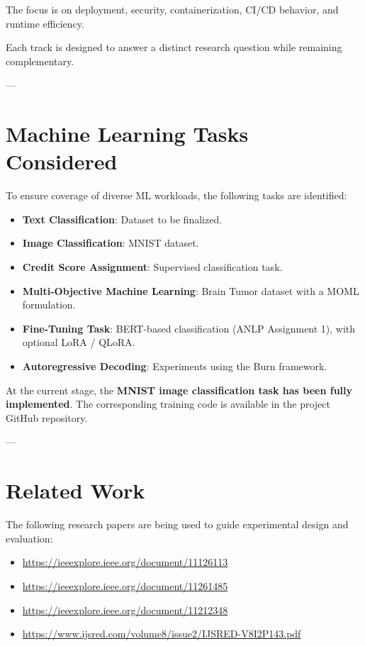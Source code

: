 \documentclass[10pt,a4paper,twocolumn]{article}
\begin{document}
The focus is on deployment, security, containerization, CI/CD behavior, and runtime efficiency.

Each track is designed to answer a distinct research question while remaining complementary.

---

\section{Machine Learning Tasks Considered}

To ensure coverage of diverse ML workloads, the following tasks are identified:

\begin{itemize}
    \item \textbf{Text Classification}: Dataset to be finalized.
    \item \textbf{Image Classification}: MNIST dataset.
    \item \textbf{Credit Score Assignment}: Supervised classification task.
    \item \textbf{Multi-Objective Machine Learning}: Brain Tumor dataset with a MOML formulation.
    \item \textbf{Fine-Tuning Task}: BERT-based classification (ANLP Assignment 1), with optional LoRA / QLoRA.
    \item \textbf{Autoregressive Decoding}: Experiments using the Burn framework.
\end{itemize}

At the current stage, the \textbf{MNIST image classification task has been fully implemented}.  
The corresponding training code is available in the project GitHub repository.

---

\section{Related Work}

The following research papers are being used to guide experimental design and evaluation:

\begin{itemize}
    \item \url{https://ieeexplore.ieee.org/document/11126113}
    \item \url{https://ieeexplore.ieee.org/document/11261485}
    \item \url{https://ieeexplore.ieee.org/document/11212348}
    \item \url{https://www.ijsred.com/volume8/issue2/IJSRED-V8I2P143.pdf}
\end{itemize}
\end{document}
